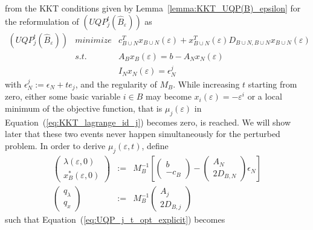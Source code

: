 \documentclass[a4paper]{article}
\begin{document}
from the KKT conditions given by Lemma~\ref{lemma:KKT_UQP(B)_epsilon} for the
reformulation of $(UQP_{j}^{t}(\hat{B}_{\varepsilon}))$ as
\begin{eqnarray*}
(UQP_{j}^{t}(\hat{B}_{\varepsilon})) 
  & minimize & c_{B \cup N}^{T} x_{B \cup N}(\varepsilon) +
  x_{B \cup N}^{T}(\varepsilon)D_{B \cup N, B \cup N}
  x_{B \cup N}(\varepsilon) \\
  & s.t. & A_{B}x_{B}(\varepsilon) = b - A_{N}x_{N}(\varepsilon)  \\
  && I_{N}x_{N}(\varepsilon) = \epsilon_{N}^{j}
\end{eqnarray*}
with $\epsilon_{N}^{j}:=\epsilon_{N} + te_{j}$, and the regularity of
$M_{B}$. 
While increasing $t$ starting from zero, either some basic variable $i \in B$
may become $x_{i}(\varepsilon)=-\varepsilon^{i}$ or a local minimum of the
objective function, that is $\mu_{j}(\varepsilon)$ in
Equation~(\ref{eq:KKT_lagrange_id_j}) becomes zero, is reached.
We will show later that these two events never happen simultaneously for the
perturbed problem.
In order to derive $\mu_{j}\left(\varepsilon, t\right)$, define
\begin{eqnarray}
\label{def:sol_eps_zero_I}
\left(\begin{array}{c}
         \lambda\left(\varepsilon, 0\right) \\
	 \hline
	 x_{B}^{*}\left(\varepsilon, 0\right)
       \end{array}
\right)
&:=&M_{B}^{-1}
\left[
  \left(\begin{array}{c}
           b \\
	   \hline
	   -c_{B}
	\end{array}
   \right)
   -
   \left(\begin{array}{c}
           A_{N}  \\
	   \hline
	   2D_{B,N}
	 \end{array}
   \right)\epsilon_{N}
\right] 
\\
\left(\begin{array}{c}
         q_{\lambda} \\
	 \hline
	 q_{x}
       \end{array}
\right)
&:=&M_{B}^{-1}
\left(\begin{array}{c}
        A_{j} \\
	\hline
	2D_{B,j}
       \end{array}
\right)
\end{eqnarray}
such that Equation~(\ref{eq:UQP_j_t_opt_explicit}) becomes
\end{document}
